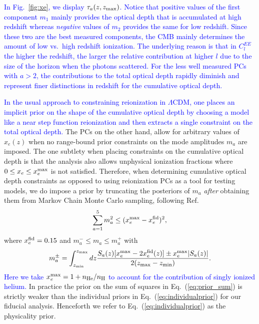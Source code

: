 \documentclass[prd,twocolumn,amsmath,amssymb,floatfix,superscriptaddress,nofootinbib]{revtex4-1}
\newcommand{\wh}[1]{\textcolor{blue}{#1}}
\begin{document}
 \wh{
 In Fig.~\ref{fig:xe}, we display $\tau_a(z,z_{\rm max})$.
 Notice that positive values of the first component $m_1$ mainly provides the optical depth that is accumulated at high redshift whereas {\it negative} values of $m_2$ provides the same for low redshift.    Since these two are the best measured components, the CMB mainly determines the amount of low vs.~high redshift ionization.
The underlying reason is that in $C_l^{EE}$ the higher the redshift, the
larger the relative contribution at higher $l$ due to the size of the horizon when the photons scattered.  For the less well measured PCs with $a>2$, the contributions to the total optical depth rapidly diminish and represent finer distinctions in redshift for the cumulative optical depth.}

\wh{
In the usual approach to constraining reionization in $\Lambda$CDM, one places an implicit prior on the shape of the cumulative optical depth by choosing a model like a near step function reionization and then extracts a single constraint on the total optical depth.}
The PCs on the other hand, allow for arbitrary values of $x_e(z)$ when no range-bound prior constraints on the mode amplitudes $m_a$ are imposed. The one subtlety when placing constraints on the cumulative optical depth is that the analysis also allows
unphysical ionization fractions where $0 \le x_e \le x_e^{\rm max}$  is not satisfied.
Therefore, when determining cumulative optical depth constraints as opposed to using reionization PCs as a tool for testing models,
 we do impose a  prior
 by truncating the posteriors of $m_a$
 {\it after} obtaining them from Markov Chain Monte Carlo sampling, following Ref.~\cite{Mortonson:2008rx}
%
\begin{equation}
\sum_{a=1}^5 m_a^2 \le (x_e^{\rm max}-x_e^{\rm fid})^2,
\label{eq:prior_sum}
\end{equation}
where $x_e^{\rm fid}=0.15$ and $m_a^{-} \le m_a \le m_a^{+}$ with
\begin{equation}
m_a^{\pm} = \int_{z_{\rm min}}^{z_{\rm max} } dz \frac{S_a(z)[x_e^{\rm max} -2 x_e^{\rm fid}(z)]
\pm x_e^{\rm max} | S_a(z)|}{2(z_{\rm max}-z_{\rm min})}.
\label{eq:individualprior}
\end{equation}
\wh{Here we take $x_e^{\rm max} = 1+ n_{\rm He}/n_{\rm H}$ to account for the contribution of singly ionized helium.}
In practice the prior on the sum of squares in Eq.~(\ref{eq:prior_sum}) is strictly weaker than the individual priors in Eq.~(\ref{eq:individualprior}) for
our fiducial analysis.  Henceforth we refer to Eq.~(\ref{eq:individualprior}) as the physicality prior.
\end{document}
